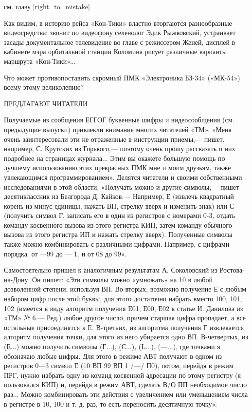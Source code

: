 \documentclass[11pt,a4paper,oneside]{article}
\begin{document}
см. главу \ref{right_to_mistake}

Как видим, в историю рейса «Кон-Тики» властно вторгаются разнообразные видеосредства: звонит по видеофону селенолог Эдик Рыжковский, устраивает засады документальное телевидение во главе с режиссером Женей, дисплей в кабинете мэра орбитальной станции Коломина рисует различные варианты маршрута «Кон-Тики»...

Что может противопоставить скромный ПМК «Электроника БЗ-34» («МК-54») всему этому великолепию?

ПРЕДЛАГАЮТ ЧИТАТЕЛИ

Получаемые из сообщения ЕГГОГ буквенные шифры и видеосообщения (см. предыдущие выпуски) привлекли внимание многих читателей «ТМ». «Меня очень заинтересовали эти не отраженные в инструкции приемы,— пишет, например, С. Крутских из Горького,— поэтому очень прошу рассказать о них подробнее на страницах журнала... Этим вы окажете большую помощь по лучшему использованию этих прекрасных ПМК мне и моим друзьям, также увлекающимся программированием». Делятся читатели и своими собственными исследованиями в этой области. «Получать можно и другие символы,— пишет десятиклассник из Белгорода Д. Кайков.— Например, Е (извлечь квадратный корень из минус единицы, нажать ВП, стрелку вверх и изменить знак) или С (получить символ Г, записать его в один из регистров с номерами 0-3, отдать команду косвенного вызова из этого регистра КИП, затем команду обычного вызова из этого регистра ИП и нажать стрелку вверх). Полученные символы также можно комбинировать с различными цифрами. Например, с цифрами порядка: от —99 до — 1. и от 08 до 99».

Самостоятельно пришел к аналогичным результатам А. Соколовский из Ростова-на-Дону. Он пишет: «Эти символы можно «умножать» на 10 в любой дозволенной степени, используя ВП. Во-вторых, возможно получение Е с любым набором цифр после этой буквы, для этого достаточно набрать вместо 100, 101, 102 (имеется в виду алгоритм получения Е01, Е00, Е02 в статье И. Данилова из «ТМ» № 6.— Ред.) любое другое число, причем старшая цифра пропадает, а все остальные присоединятся к Е. В-третьих, из алгоритма получения Г извлекается алгоритм получения точки, для этого из него убирается одно ВП. В-четвертых, из (Е...) можно получить символы (Г...), (С...), (L...), (—...), где точками я обозначаю любые цифры. Для этого в режиме АВТ получают в одном из регистров 0—3 символ Е (10 ВП 99 ВП 1 /—/ П0), потом, перейдя в режим ПРГ, нужно набрать одну из команд косвенной адресации по этому регистру (я пользовался КИП) и, перейдя в режим АВТ, сделать В/О ПП необходимое число раз... Можно комбинировать эти действия с увеличением или уменьшением числа в регистре в 10, 100 и т. д. раз, то есть переносить десятичную точку».
\end{document}
